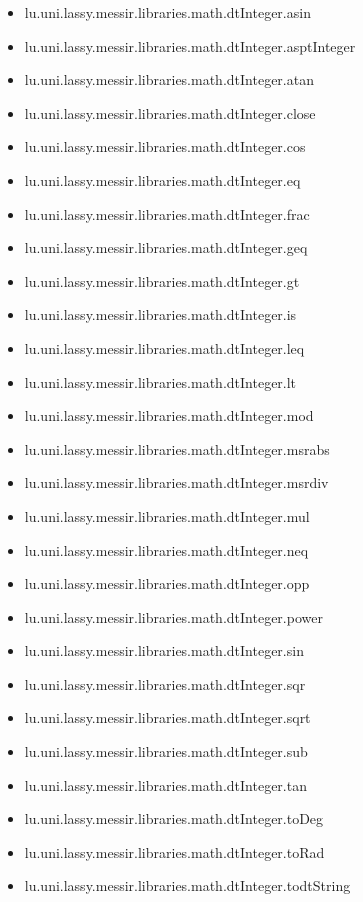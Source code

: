 \begin{itemize}
\item lu.uni.lassy.messir.libraries.math.dtInteger.asin 
\item lu.uni.lassy.messir.libraries.math.dtInteger.asptInteger 
\item lu.uni.lassy.messir.libraries.math.dtInteger.atan 
\item lu.uni.lassy.messir.libraries.math.dtInteger.close 
\item lu.uni.lassy.messir.libraries.math.dtInteger.cos 
\item lu.uni.lassy.messir.libraries.math.dtInteger.eq 
\item lu.uni.lassy.messir.libraries.math.dtInteger.frac 
\item lu.uni.lassy.messir.libraries.math.dtInteger.geq 
\item lu.uni.lassy.messir.libraries.math.dtInteger.gt 
\item lu.uni.lassy.messir.libraries.math.dtInteger.is 
\item lu.uni.lassy.messir.libraries.math.dtInteger.leq 
\item lu.uni.lassy.messir.libraries.math.dtInteger.lt 
\item lu.uni.lassy.messir.libraries.math.dtInteger.mod 
\item lu.uni.lassy.messir.libraries.math.dtInteger.msrabs 
\item lu.uni.lassy.messir.libraries.math.dtInteger.msrdiv 
\item lu.uni.lassy.messir.libraries.math.dtInteger.mul 
\item lu.uni.lassy.messir.libraries.math.dtInteger.neq 
\item lu.uni.lassy.messir.libraries.math.dtInteger.opp 
\item lu.uni.lassy.messir.libraries.math.dtInteger.power 
\item lu.uni.lassy.messir.libraries.math.dtInteger.sin 
\item lu.uni.lassy.messir.libraries.math.dtInteger.sqr 
\item lu.uni.lassy.messir.libraries.math.dtInteger.sqrt 
\item lu.uni.lassy.messir.libraries.math.dtInteger.sub 
\item lu.uni.lassy.messir.libraries.math.dtInteger.tan 
\item lu.uni.lassy.messir.libraries.math.dtInteger.toDeg 
\item lu.uni.lassy.messir.libraries.math.dtInteger.toRad 
\item lu.uni.lassy.messir.libraries.math.dtInteger.todtString 

\end{itemize}
